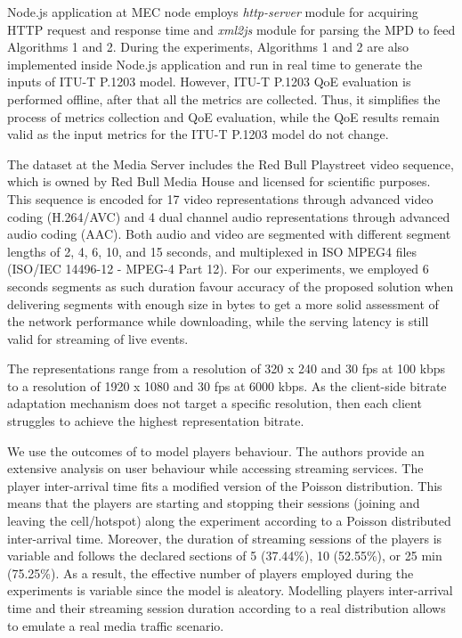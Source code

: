 Node.js application at MEC node employs \textit{http-server} module for acquiring HTTP request and response time and \textit{xml2js} module for parsing the MPD to feed Algorithms 1 and 2. During the experiments, Algorithms 1 and 2 are also implemented inside Node.js application and run in real time to generate the inputs of ITU-T P.1203 model. However, ITU-T P.1203 QoE evaluation is performed offline, after that all the metrics are collected. Thus, it simplifies the process of metrics collection and QoE evaluation, while the QoE results remain valid as the input metrics for the ITU-T P.1203 model do not change.

The dataset at the Media Server includes the Red Bull Playstreet video sequence, which is owned by Red Bull Media House and licensed for scientific purposes. This sequence is encoded for 17 video representations through advanced video coding (H.264/AVC) and 4 dual channel audio representations through advanced audio coding (AAC). Both audio and video are segmented with different segment lengths of 2, 4, 6, 10, and 15 seconds, and multiplexed in ISO MPEG4 files (ISO/IEC \hbox{14496-12} - \hbox{MPEG-4} Part 12). For our experiments, we employed 6 seconds segments as such duration favour accuracy of the proposed solution when delivering segments with enough size in bytes to get a more solid assessment of the network performance while downloading, while the serving latency is still valid for streaming of live events.

The representations range from a resolution of 320 x 240 and 30 fps at 100 kbps to a resolution of 1920 x 1080 and 30 fps at 6000 kbps. As the client-side bitrate adaptation mechanism does not target a specific resolution, then each client struggles to achieve the highest representation bitrate.

We use the outcomes of \cite{yu2006} to model players behaviour. The authors provide an extensive analysis on user behaviour while accessing streaming services. The player inter-arrival time fits a modified version of the Poisson distribution. This means that the players are starting and stopping their sessions (joining and leaving the cell/hotspot) along the experiment according to a Poisson distributed inter-arrival time. Moreover, the duration of streaming sessions of the players is variable and follows the declared sections of 5 (37.44\%), 10 (52.55\%), or 25 min (75.25\%). As a result, the effective number of players employed during the experiments is variable since the model is aleatory. Modelling players inter-arrival time and their streaming session duration according to a real distribution allows to emulate a real media traffic scenario.

